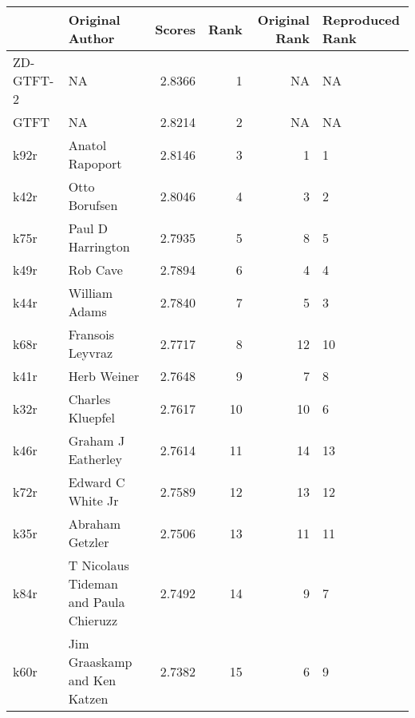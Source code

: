 \begin{tabular}{llrrrl}
\toprule
{} &                        Original Author &  Scores &  Rank &  Original Rank & Reproduced Rank \\
\midrule
ZD-GTFT-2 &                                     NA &  2.8366 &     1 &             NA &              NA \\
GTFT      &                                     NA &  2.8214 &     2 &             NA &              NA \\
k92r      &                        Anatol Rapoport &  2.8146 &     3 &              1 &               1 \\
k42r      &                          Otto Borufsen &  2.8046 &     4 &              3 &               2 \\
k75r      &                      Paul D Harrington &  2.7935 &     5 &              8 &               5 \\
k49r      &                               Rob Cave &  2.7894 &     6 &              4 &               4 \\
k44r      &                          William Adams &  2.7840 &     7 &              5 &               3 \\
k68r      &                       Fransois Leyvraz &  2.7717 &     8 &             12 &              10 \\
k41r      &                            Herb Weiner &  2.7648 &     9 &              7 &               8 \\
k32r      &                       Charles Kluepfel &  2.7617 &    10 &             10 &               6 \\
k46r      &                     Graham J Eatherley &  2.7614 &    11 &             14 &              13 \\
k72r      &                      Edward C White Jr &  2.7589 &    12 &             13 &              12 \\
k35r      &                        Abraham Getzler &  2.7506 &    13 &             11 &              11 \\
k84r      &  T Nicolaus Tideman and Paula Chieruzz &  2.7492 &    14 &              9 &               7 \\
k60r      &           Jim Graaskamp and Ken Katzen &  2.7382 &    15 &              6 &               9 \\
\bottomrule
\end{tabular}

